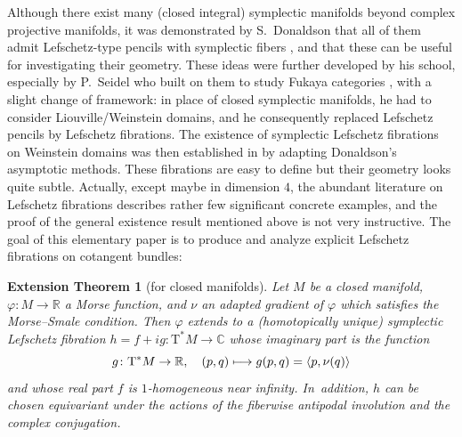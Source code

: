 \documentclass[JEP,XML,SOM,Unicode]{cedram}
\newcommand\mto{\mathchoice{\longmapsto}{\mapsto}{\mapsto}{\mapsto}}
\newcommand{\C}{{\mathbb C}}
\newcommand{\R}{{\mathbb R}}
\newcommand{\tu}[1]{\textup{#1}}
\newcommand{\sT}{\mathrm{T}^\ast}
\newcommand{\prg}[1]{\langle #1 \rangle}
\let\on\colon
\theoremstyle{plain}
\newtheorem{extension-theorem}[theorem]{Extension Theorem}
\theoremstyle{definition}
\begin{document}
\maketitle
\vspace*{-\baselineskip}
\tableofcontents
\mainmatter

Although there exist many (closed integral) symplectic manifolds beyond complex
projective manifolds, it was demonstrated by S.~Donaldson that all of them admit
Lefschetz-type pencils with symplectic fibers \cite{Do}, and that these can be
useful for investigating their geometry. These ideas were further developed by
his school, especially by P.~Seidel who built on them to study Fukaya categories
\cite{Se}, with a slight change of framework: in place of closed symplectic
manifolds, he had to consider Liouville/Weinstein domains, and he consequently
replaced Lefschetz pencils by Lefschetz fibrations. The existence of symplectic
Lefschetz fibrations on Weinstein domains was then established in \cite{GP} by
adapting Donaldson's asymptotic methods. These fibrations are easy to define but
their geometry looks quite subtle. Actually, except maybe in dimension $4$, the
abundant literature on Lefschetz fibrations describes rather few significant
concrete examples, and the proof of the general existence result mentioned above
is not very instructive. The goal of this elementary paper is to produce and
analyze explicit Lefschetz fibrations on cotangent bundles:

\begin{extension-theorem}[for closed manifolds] \label{t:closed}
Let $M$ be a closed manifold, \hbox{$\varphi \on M \!\to\! \R$} a Morse function, and $\nu$
an adapted gradient of $\varphi$ which satisfies the Morse--Smale condition.
Then $\varphi$ extends to a \tu(homotopically unique\tu) symplectic Lefschetz
fibration $h = f+ig \on \sT M \to \C$ whose imaginary part is the function
\[
g \on \sT M \to \R, \quad (p,q) \mto g(p,q) = \prg{p, \nu(q)}
\]
and whose real part $f$ is $1$-homogeneous near infinity. In~addition, $h$ can
be chosen equivariant under the actions of the fiberwise antipodal involution
and the complex conjugation.
\end{extension-theorem}
\end{document}
